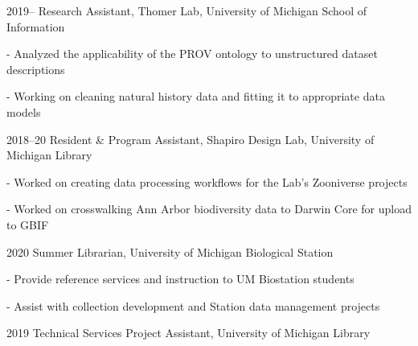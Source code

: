 \documentclass[12pt,letterpaper]{report}
\newcommand{\listitemspace}{0.25em}
\renewenvironment{itemize}
{\begin{list}{}{\setlength{\leftmargin}{0em}
            \setlength{\parskip}{0em}
            \setlength{\itemsep}{\listitemspace}
            \setlength{\parsep}{\listitemspace}}}
{\end{list}}
\begin{document}
\begin{tablist}
    
	\item[2019--] \tab Research Assistant, Thomer Lab, University of Michigan School of Information

	\begin{itemize} \begin{footnotesize}

		\item - Analyzed the applicability of the PROV ontology to unstructured dataset descriptions

		\item - Working on cleaning natural history data and fitting it to appropriate data models

	\end{footnotesize} \end{itemize}
        
	\item[2018--20] \tab Resident \& Program Assistant, Shapiro Design Lab, University of Michigan Library

	\begin{itemize} \begin{footnotesize}

		\item - Worked on creating data processing workflows for the Lab’s Zooniverse projects 

		\item - Worked on crosswalking Ann Arbor biodiversity data to Darwin Core for upload to GBIF

	\end{footnotesize} \end{itemize}

	\item[2020] \tab Summer Librarian, University of Michigan Biological Station

	\begin{itemize} \begin{footnotesize}

		\item - Provide reference services and instruction to UM Biostation students

		\item - Assist with collection development and Station data management projects

	\end{footnotesize} \end{itemize}
    
	\item[2019] \tab Technical Services Project Assistant, University of Michigan Library


\end{tablist}
\end{document}
